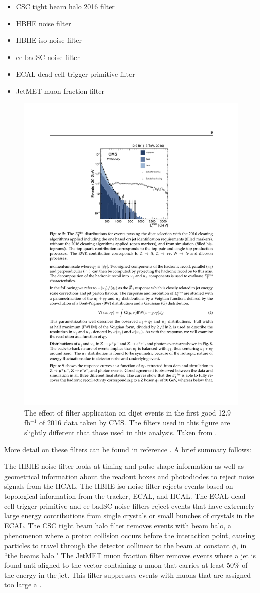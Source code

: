     \begin{itemize}
    \item CSC tight beam halo 2016 filter
    \item HBHE noise filter
    \item HBHE iso noise filter
    \item ee badSC noise filter
    \item ECAL dead cell trigger primitive filter
    \item JetMET muon fraction filter
    \end{itemize}

    \begin{figure}[!h]
      \centering
      \includegraphics[width=.48\textwidth]{figures/met_filter_efficacy.pdf}
      \caption{The effect of \MET filter application on dijet events in the first good 12.9 fb$^{-1}$ of 2016 data taken by CMS. The filters used in this figure are slightly different that those used in this analysis. Taken from \cite{cms_met}.}
      \label{fig:met_filters_efficacy}
    \end{figure}

    More detail on these filters can be found in reference \cite[sec 5]{cms_met}. A brief summary follows:

    The HBHE noise filter looks at timing and pulse shape information as well as geometrical information about the readout boxes and photodiodes to reject noise signals from the HCAL. The HBHE iso noise filter rejects events based on topological information from the tracker, ECAL, and HCAL. The ECAL dead cell trigger primitive and ee badSC noise filters reject events that have extremely large energy contributions from single crystals or small bunches of crystals in the ECAL. The CSC tight beam halo filter removes events with beam halo, a phenomenon where a proton collision occurs before the interaction point, causing particles to travel through the detector collinear to the beam at constant $\phi$, in ``the beams halo." The JetMET muon fraction filter removes events where a jet is found anti-aligned to the \MET vector containing a muon that carries at least 50\% of the energy in the jet. This filter suppresses events with muons that are assigned too large a \pt.

